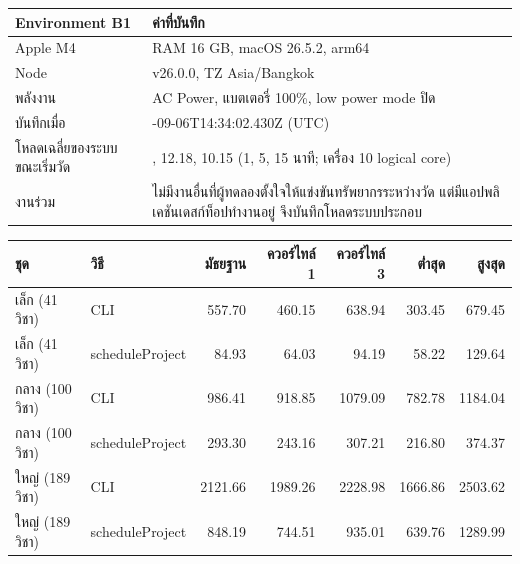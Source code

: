 \begin{center}\begin{minipage}{\textwidth}\centering{}\label{tab:env}{\small\begin{tabular}{>{\raggedright\arraybackslash}p{3cm}>{\raggedright\arraybackslash}p{9cm}}\toprule Environment B1 & ค่าที่บันทึก \\\midrule
Apple M4 & RAM 16 GB, macOS 26.5.2, arm64 \\
Node & v26.0.0, TZ Asia/Bangkok \\
พลังงาน & AC Power, แบตเตอรี่ 100\%, low power mode ปิด \\
บันทึกเมื่อ & 2026-09-06T14:34:02.430Z (UTC) \\
โหลดเฉลี่ยของระบบขณะเริ่มวัด & 9.78, 12.18, 10.15 (1, 5, 15 นาที; เครื่อง 10 logical core) \\
งานร่วม & ไม่มีงานอื่นที่ผู้ทดลองตั้งใจให้แข่งขันทรัพยากรระหว่างวัด แต่มีแอปพลิเคชันเดสก์ท็อปทำงานอยู่ จึงบันทึกโหลดระบบประกอบ \\\bottomrule\end{tabular}}\end{minipage}\end{center}
\begin{center}\begin{minipage}{\textwidth}\centering{}\label{tab:runtime}{\small\tabcolsep=2pt\begin{tabular}{>{\raggedright\arraybackslash}p{2.2cm}>{\raggedright\arraybackslash}p{2.9cm}rrrrr}\toprule ชุด & วิธี & มัธยฐาน & ควอร์ไทล์ 1 & ควอร์ไทล์ 3 & ต่ำสุด & สูงสุด \\\midrule
เล็ก (41 วิชา) & CLI & 557.70 & 460.15 & 638.94 & 303.45 & 679.45 \\
เล็ก (41 วิชา) & {\small scheduleProject} & 84.93 & 64.03 & 94.19 & 58.22 & 129.64 \\
กลาง (100 วิชา) & CLI & 986.41 & 918.85 & 1079.09 & 782.78 & 1184.04 \\
กลาง (100 วิชา) & {\small scheduleProject} & 293.30 & 243.16 & 307.21 & 216.80 & 374.37 \\
ใหญ่ (189 วิชา) & CLI & 2121.66 & 1989.26 & 2228.98 & 1666.86 & 2503.62 \\
ใหญ่ (189 วิชา) & {\small scheduleProject} & 848.19 & 744.51 & 935.01 & 639.76 & 1289.99 \\
\bottomrule\end{tabular}}\end{minipage}\end{center}
